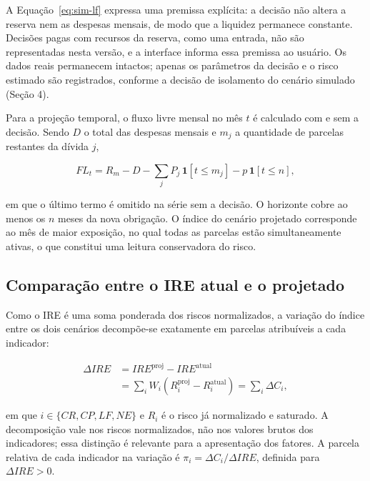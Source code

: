 \documentclass[portuguese]{sbc2025}%
\begin{document}
A Equação~\ref{eq:sim-lf} expressa uma premissa explícita: a decisão não altera a reserva nem as despesas mensais, de modo que a liquidez permanece constante. Decisões pagas com recursos da reserva, como uma entrada, não são representadas nesta versão, e a interface informa essa premissa ao usuário. Os dados reais permanecem intactos; apenas os parâmetros da decisão e o risco estimado são registrados, conforme a decisão de isolamento do cenário simulado (Seção 4).

Para a projeção temporal, o fluxo livre mensal no mês $t$ é calculado com e sem a decisão. Sendo $D$ o total das despesas mensais e $m_j$ a quantidade de parcelas restantes da dívida $j$,

\begin{equation}
FL_t = R_m - D - \sum_{j} P_j\,\mathbf{1}[t \le m_j] - p\,\mathbf{1}[t \le n],
\label{eq:sim-fluxo}
\end{equation}

em que o último termo é omitido na série sem a decisão. O horizonte cobre ao menos os $n$ meses da nova obrigação. O índice do cenário projetado corresponde ao mês de maior exposição, no qual todas as parcelas estão simultaneamente ativas, o que constitui uma leitura conservadora do risco.

\subsection{Comparação entre o IRE atual e o projetado}

Como o IRE é uma soma ponderada dos riscos normalizados, a variação do índice entre os dois cenários decompõe-se exatamente em parcelas atribuíveis a cada indicador:

\begin{equation}
\begin{split}
\Delta IRE &= IRE^{\mathrm{proj}} - IRE^{\mathrm{atual}} \\
&= \sum_{i} W_i \left( R_i^{\mathrm{proj}} - R_i^{\mathrm{atual}} \right) = \sum_{i} \Delta C_i,
\end{split}
\label{eq:delta-ire}
\end{equation}

em que $i \in \{CR, CP, LF, NE\}$ e $R_i$ é o risco já normalizado e saturado. A decomposição vale nos riscos normalizados, não nos valores brutos dos indicadores; essa distinção é relevante para a apresentação dos fatores. A parcela relativa de cada indicador na variação é $\pi_i = \Delta C_i / \Delta IRE$, definida para $\Delta IRE > 0$.
\end{document}
